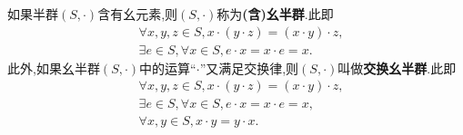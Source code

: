 \documentclass[../../main.tex]{subfiles}
\begin{document}
\begin{definition}[含幺半群和交换含幺半群]
如果半群\((S,\cdot)\)含有幺元素,则\((S,\cdot)\)称为\textbf{(含)幺半群}.此即
\begin{align*}
&\forall x, y, z \in S, x \cdot (y \cdot z) = (x \cdot y) \cdot z,\\
&\exists e \in S, \forall x \in S, e \cdot x = x \cdot e = x.
\end{align*} 
此外,如果幺半群\((S,\cdot)\)中的运算“$\cdot$”又满足交换律,则\((S,\cdot)\)叫做\textbf{交换幺半群}.此即
\begin{align*}
&\forall x, y, z \in S, x \cdot (y \cdot z) = (x \cdot y) \cdot z,\\
&\exists e \in S, \forall x \in S, e \cdot x = x \cdot e = x,\\
&\forall x,y\in S,x\cdot y=y\cdot x.
\end{align*} 
\end{definition}
\end{document}
